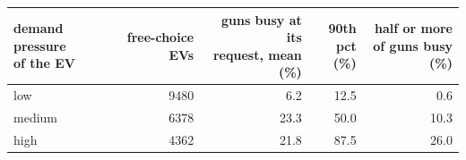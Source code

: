 \begin{tabular}{lrrrr}\toprule
\shortstack{demand pressure\\of the EV} & free-choice EVs & \shortstack{guns busy at its\\request, mean (\%)} & \shortstack{90th\\pct (\%)} & \shortstack{half or more\\of guns busy (\%)} \\ \midrule
low & 9480 & 6.2 & 12.5 & 0.6 \\
medium & 6378 & 23.3 & 50.0 & 10.3 \\
high & 4362 & 21.8 & 87.5 & 26.0 \\
\bottomrule\end{tabular}
